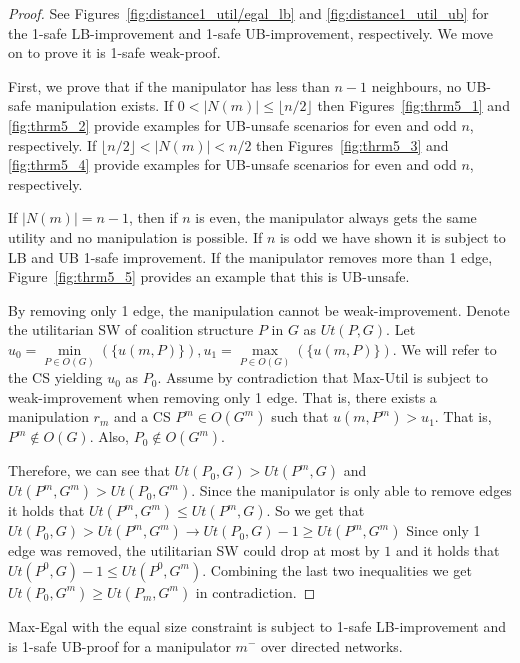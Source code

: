 \begin{proof}
See Figures~\ref{fig:distance1_util/egal_lb} and \ref{fig:distance1_util_ub} for the 1-safe LB-improvement and 1-safe UB-improvement, respectively. We move on to prove it is 1-safe weak-proof.

First, we prove that if the manipulator has less than $n-1$ neighbours, no UB-safe manipulation exists.
If $0<|N(m)|\leq \lfloor n/2 \rfloor$ then Figures~\ref{fig:thrm5_1} and \ref{fig:thrm5_2} provide examples for UB-unsafe scenarios for even and odd $n$, respectively.
If $\lfloor n/2 \rfloor<|N(m)| < n/2$ then Figures~\ref{fig:thrm5_3} and \ref{fig:thrm5_4} provide examples for UB-unsafe scenarios for even and odd $n$, respectively.

If $|N(m)| = n-1$, then if $n$ is even, the manipulator always gets the same utility and no manipulation is possible.
If $n$ is odd we have shown it is subject to LB and UB 1-safe improvement.
If the manipulator removes more than 1 edge, Figure~\ref{fig:thrm5_5} provides an example that this is UB-unsafe.

By removing only 1 edge, the manipulation cannot be weak-improvement. 
Denote the utilitarian SW of coalition structure $P$ in $G$ as $Ut(P,G)$.
Let 
$
u_0=\underset{P\in O(G)}{\min}(\{u(m,P)\}),
u_1=\underset{P\in O(G)}{\max}(\{u(m,P)\})
$.
We will refer to the CS yielding $u_0$ as $P_0$.
Assume by contradiction that Max-Util is subject to weak-improvement when removing only 1 edge.
That is, there exists a manipulation $r_{m}$ and a CS $P^m\in O(G^{m})$ such that $u(m,P^m) > u_1$. That is, $P^m\notin O(G)$. Also, $P_0\notin O(G^m)$.

Therefore, we can see that $Ut(P_0,G) > Ut(P^m,G)$ and $Ut(P^m,G^m)>Ut(P_0,G^m)$.
Since the manipulator is only able to remove edges it holds that $Ut(P^m,G^m)\leq Ut(P^m,G)$. So we get that $Ut(P_0,G) > Ut(P^m,G^m) \xrightarrow{} Ut(P_0,G) - 1 \geq Ut(P^m,G^m)$
Since only 1 edge was removed, the utilitarian SW could drop at most by $1$ and it holds that $Ut(P^0,G) - 1 \leq Ut(P^0,G^m)$.
Combining the last two inequalities we get $ Ut(P_0,G^m) \geq Ut(P_m,G^m) $ in contradiction.
\end{proof}


\begin{proposition}
\label{thm:Egal_distance1}
Max-Egal with the equal size constraint is subject to 1-safe LB-improvement and is 1-safe UB-proof for a manipulator $m^-$ over directed networks.
\end{proposition}

